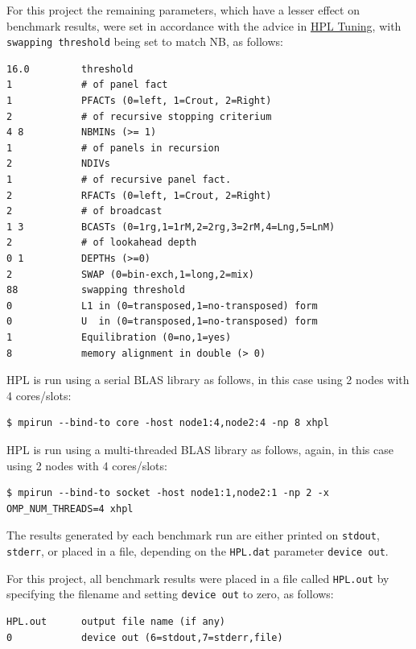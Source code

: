 \documentclass{report}
\begin{document}
For this project the remaining parameters, which have a lesser effect on benchmark results, were set in accordance with the advice in \href{https://www.netlib.org/benchmark/hpl/tuning.html}{HPL Tuning}, with \verb|swapping threshold| being set to match NB, as follows:

\lstset{style=listing}
\begin{lstlisting}[numbers=none, caption=HPL.dat]
16.0         threshold
1            # of panel fact
1            PFACTs (0=left, 1=Crout, 2=Right)
2            # of recursive stopping criterium
4 8          NBMINs (>= 1)
1            # of panels in recursion
2            NDIVs
1            # of recursive panel fact.
2            RFACTs (0=left, 1=Crout, 2=Right)
2            # of broadcast
1 3          BCASTs (0=1rg,1=1rM,2=2rg,3=2rM,4=Lng,5=LnM)
2            # of lookahead depth
0 1          DEPTHs (>=0)
2            SWAP (0=bin-exch,1=long,2=mix)
88           swapping threshold
0            L1 in (0=transposed,1=no-transposed) form
0            U  in (0=transposed,1=no-transposed) form
1            Equilibration (0=no,1=yes)
8            memory alignment in double (> 0)
\end{lstlisting}

HPL is run using a serial BLAS library as follows, in this case using 2 nodes with 4 cores/slots:

\lstset{style=type}
\begin{lstlisting}
$ mpirun --bind-to core -host node1:4,node2:4 -np 8 xhpl
\end{lstlisting}

HPL is run using a multi-threaded BLAS library as follows, again, in this case using 2 nodes with 4 cores/slots:

\lstset{style=type}
\begin{lstlisting}
$ mpirun --bind-to socket -host node1:1,node2:1 -np 2 -x OMP_NUM_THREADS=4 xhpl
\end{lstlisting}

The results generated by each benchmark run are either printed on \verb|stdout|, \verb|stderr|, or placed in a file, depending on the \verb|HPL.dat| parameter \verb|device out|.

For this project, all benchmark results were placed in a file called \verb|HPL.out| by specifying the filename and setting \verb|device out| to zero, as follows:

\lstset{style=listing}
\begin{lstlisting}[numbers=none, caption=HPL.dat]
HPL.out      output file name (if any)
0            device out (6=stdout,7=stderr,file)
\end{lstlisting}
\end{document}

